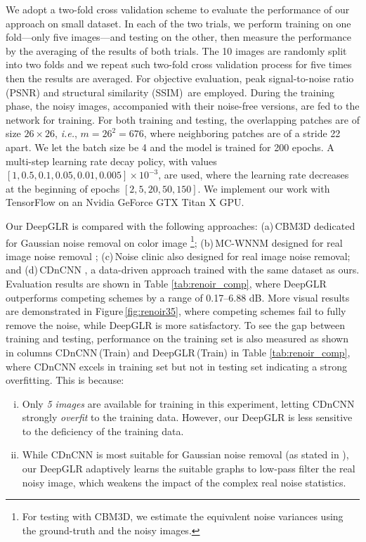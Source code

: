 \documentclass[10pt,twocolumn,letterpaper]{article}
\begin{document}
We adopt a two-fold cross validation scheme to evaluate the performance of our approach on small dataset. 
In each of the two trials, we perform training on one fold---only five images---and testing on the other, then measure the performance by the averaging of the results of both trials. 
The 10 images are randomly split into two folds and we repeat such two-fold cross validation process for five times then the results are averaged. 
For objective evaluation, peak signal-to-noise ratio (PSNR) and structural similarity (SSIM)\,\cite{wang2004image} are employed. 
During the training phase, the noisy images, accompanied with their noise-free versions, are fed to the network for training.
For both training and testing, the overlapping patches are of size $26 \times 26$, {\it i.e.}, $m = 26^2 = 676$, where neighboring patches are of a stride 22 apart. 
We let the batch size be 4 and the model is trained for 200 epochs. 
A multi-step learning rate decay policy, with values $[1, 0.5, 0.1, 0.05, 0.01, 0.005]\times 10^{-3}$, are used, where the learning rate decreases at the beginning of epochs $[2, 5, 20, 50, 150]$. 
We implement our work with TensorFlow \cite{tensorflow} on an Nvidia GeForce GTX Titan X GPU.

Our DeepGLR is compared with the following approaches: (a)\,CBM3D dedicated for Gaussian noise removal on color image \cite{dabov2007image}\footnote{For testing with CBM3D, we estimate the equivalent noise variances using the ground-truth and the noisy images.}; (b)\,MC-WNNM designed for real image noise removal \cite{xu2017multi}; (c)\,Noise clinic \cite{lebrun2015noise} also designed for real image noise removal; and (d)\,CDnCNN \cite{zhang2017beyond}, a data-driven approach trained with the same dataset as ours. Evaluation results are shown in Table \ref{tab:renoir_comp}, where DeepGLR outperforms competing schemes by a range of 0.17--6.88 dB. 
More visual results are demonstrated in Figure\,\ref{fig:renoir35}, where competing schemes fail to fully remove the noise, while DeepGLR is more satisfactory.
To see the gap between training and testing, performance on the training set is also measured as shown in columns CDnCNN\,(Train) and DeepGLR\,(Train) in Table \ref{tab:renoir_comp}, where CDnCNN excels in training set but not in testing set indicating a strong overfitting. 
This is because: 
%
\begin{enumerate}[(i)]
\item Only \emph{5 images} are available for training in this experiment, letting CDnCNN strongly \emph{overfit} to the training data. However, our DeepGLR is less sensitive to the deficiency of the training data.
%
\item While CDnCNN is most suitable for Gaussian noise removal (as stated in \cite{zhang2017beyond}), our DeepGLR adaptively learns the suitable graphs to low-pass filter the real noisy image, which weakens the impact of the complex real noise statistics.
\end{enumerate}
\end{document}
